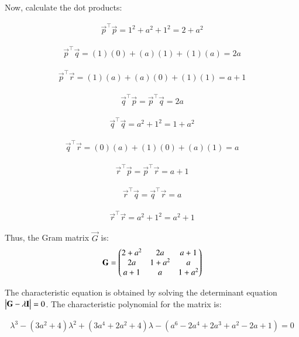 \documentclass[journal]{IEEEtran}
\begin{document}
Now, calculate the dot products:

\begin{align}
\vec{p}^\top \vec{p} = 1^2 + a^2 + 1^2 = 2+a^2
\end{align}

\begin{align}
\vec{p}^\top \vec{q} = (1)(0) + (a)(1) + (1)(a) = 2a
\end{align}

\begin{align}
\vec{p}^\top \vec{r} = (1)(a) + (a)(0) + (1)(1) = a+1
\end{align}

\begin{align}
\vec{q}^\top \vec{p} = \vec{p}^\top \vec{q} = 2a
\end{align}

\begin{align}
\vec{q}^\top \vec{q} = a^2 + 1^2 = 1 + a^2
\end{align}

\begin{align}
\vec{q}^\top \vec{r} = (0)(a) + (1)(0) + (a)(1) = a
\end{align}

\begin{align}
\vec{r}^\top \vec{p} = \vec{p}^\top \vec{r} = a + 1
\end{align}

\begin{align}
\vec{r}^\top \vec{q} = \vec{q}^\top \vec{r} = a
\end{align}

\begin{align}
\vec{r}^\top \vec{r} = a^2 + 1^2 = a^2 + 1 
\end{align}

Thus, the Gram matrix $ \vec{G} $ is:
\begin{align}
\mathbf{G} = \begin{pmatrix}
2+a^2 & 2a & a+1 \\
2a & 1+a^2 & a \\
a+1 & a & 1+a^2
\end{pmatrix}
\end{align}

The characteristic equation is obtained by solving the determinant equation \( \begin{vmatrix}\mathbf{G} - \lambda \mathbf{I}\end{vmatrix} = 0 \). The characteristic polynomial for the matrix is:

\begin{align}
\lambda^3 - (3a^2+4)\lambda^2 + (3a^4+2a^2+4)\lambda - (a^6-2a^4+2a^3+a^2-2a+1) = 0
\end{align}
\end{document}
